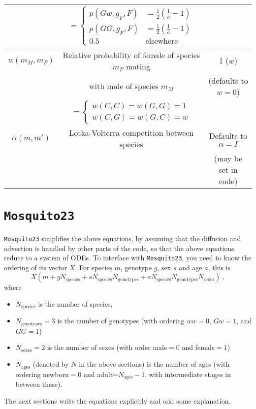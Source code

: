 \documentclass[11pt,a4paper]{article}
\begin{document}
\begin{center}
\begin{tabular}{ |c|c|c|}
     & $ = \begin{cases}
		p(Gw, g_F, F) & = \frac{1}{2}\left(\frac{1}{a} - 1\right) \\
		p(GG, g_F, F) & = \frac{1}{2}\left(\frac{1}{a} - 1\right) \\
		0.5 & \textrm{elsewhere}
		\end{cases}$ &  \\
    \hline
		$w(m_M, m_F)$ & Relative probability of female of species $m_F$ mating & 1 ($w$) \\
		& with male of species $m_M$ & (defaults to $w=0$) \\
		& $ = \begin{cases}
		w(C,C) = w(G,G) = 1 \\
		w(C,G) = w(G,C) = w
		\end{cases}$ &  \\
		\hline
$\alpha(m, m')$ & Lotka-Volterra competition between species & Defaults to $\alpha=I$ \\
 & & (may be set in code)
\\
\hline
\end{tabular}
\end{center}

\section{{\tt Mosquito23}}

{\tt Mosquito23} simplifies the above equations, by assuming that the diffusion and advection is handled by other parts of the code, so that the above equations reduce to a system of ODEs.  To interface with {\tt Mosquito23}, you need to know the ordering of its vector $X$.  For species $m$, genotype $g$, sex $s$ and age $a$, this is
\begin{equation}
X\left(m + gN_{\mathrm{species}} + sN_{\mathrm{species}}N_{\mathrm{genotypes}} + aN_{\mathrm{species}}N_{\mathrm{genotypes}}N_{\mathrm{sexes}} \right) \ ,
\end{equation}
where
\begin{itemize}
\item $N_{\mathrm{species}}$ is the number of species,
\item $N_{\mathrm{genotypes}} = 3$ is the number of genotypes (with ordering $ww=0$, $Gw=1$, and $GG=1$)
\item $N_{\mathrm{sexes}} = 2$ is the number of sexes (with order male$=0$ and female$=1$)
\item $N_{\mathrm{ages}}$ (denoted by $N$ in the above sections) is the number of ages (with ordering newborn$=0$ and adult=$N_{\mathrm{ages}}-1$, with intermediate stages in between these).
\end{itemize}
The next sections write the equations explicitly and add some explanation.
\end{document}
